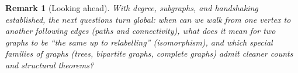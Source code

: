 \documentclass[11pt]{article}
\theoremstyle{defstyle}
\theoremstyle{thmstyle}
\theoremstyle{notstyle}
\newtheorem*{remark}{Remark}
\theoremstyle{cautionstyle}
\begin{document}
\begin{notebox}
\begin{remark}[Looking ahead]
With degree, subgraphs, and handshaking established, the next questions
turn \emph{global}: when can we walk from one vertex to another following
edges (\emph{paths} and \emph{connectivity}), what does it mean for two
graphs to be ``the same up to relabelling'' (\emph{isomorphism}), and
which special families of graphs (trees, bipartite graphs, complete
graphs) admit cleaner counts and structural theorems?
\end{remark}
\end{notebox}
\end{document}
